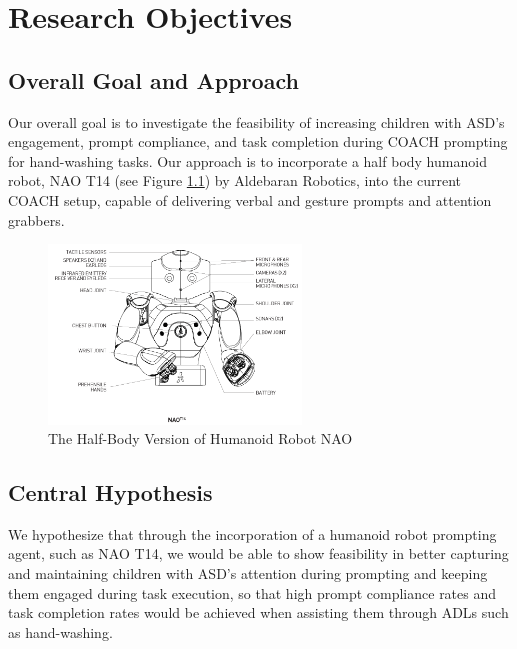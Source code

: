 \chapter{Research Objectives}

\section{Overall Goal and Approach}
Our overall goal is to investigate the feasibility of increasing children with ASD's engagement, prompt compliance, and task completion during COACH prompting for hand-washing tasks.  Our approach is to incorporate a half body humanoid robot, NAO T14 (see Figure \ref{fig:HalfBodyNAO}) by Aldebaran Robotics, into the current COACH setup, capable of delivering verbal and gesture prompts and attention grabbers.

\begin{figure} [h]
	\centering
	\includegraphics[width=0.6\textwidth]{./img/nao_t14_schema}
	\caption{The Half-Body Version of Humanoid Robot NAO}
	\label{fig:HalfBodyNAO}
\end{figure}


\section{Central Hypothesis}
We hypothesize that through the incorporation of a humanoid robot prompting agent, such as NAO T14, we would be able to show feasibility in better capturing and maintaining children with ASD's attention during prompting and keeping them engaged during task execution, so that high prompt compliance rates and task completion rates would be achieved when assisting them through ADLs such as hand-washing.


